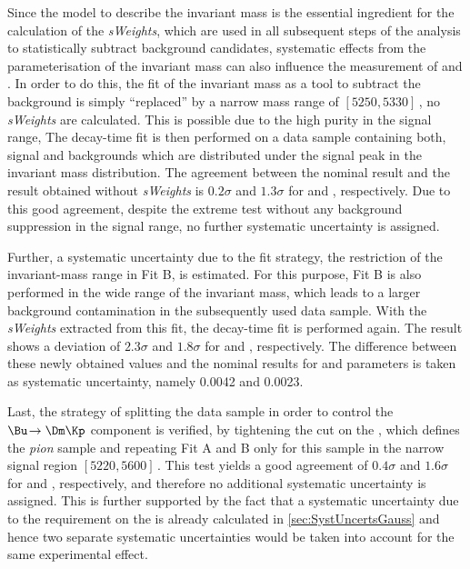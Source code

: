Since the model to describe the invariant mass is the essential ingredient for the calculation of the \emph{sWeights}, which are used in all subsequent steps of the analysis to statistically subtract background candidates, systematic effects from the parameterisation of the invariant mass can also influence the measurement of \Sf and \Sfbar.
In order to do this, the fit of the invariant mass as a tool to subtract the background is simply \enquote{replaced} by a narrow mass range of $[5250,5330]\,$\si[per-mode=symbol]{\MeVcc}, \ie no \emph{sWeights} are calculated.
This is possible due to the high purity in the signal range,
The decay-time fit is then performed on a data sample containing both, signal and backgrounds which are distributed under the signal peak in the invariant mass distribution.
The agreement between the nominal result and the result obtained without \emph{sWeights} is $0.2\sigma$ and $1.3\sigma$ for \Sf and \Sfbar, respectively.
Due to this good agreement, despite the extreme test without any background suppression in the signal range, no further systematic uncertainty is assigned.

Further, a systematic uncertainty due to the fit strategy, \ie the restriction of the invariant-mass range in Fit B, is estimated.
For this purpose, Fit B is also performed in the wide range of the invariant mass, which leads to a larger background contamination in the subsequently used data sample.
With the \emph{sWeights} extracted from this fit, the decay-time fit is performed again.
The result shows a deviation of $2.3\sigma$ and $1.8\sigma$ for \Sf and \Sfbar, respectively.
The difference between these newly obtained values and the nominal results for \Sf and \Sfbar parameters is taken as systematic uncertainty, namely \num{0.0042} and \num{0.0023}.

Last, the strategy of splitting the data sample in order to control the $\Bu\!\to\Dm\Kp$ component is verified, by tightening the cut on the \dllkpi, which defines the \emph{pion} sample and repeating Fit A and B only for this sample in the narrow signal region $[5220, 5600]\,$\si[per-mode=symbol]{\MeVcc}.
This test yields a good agreement of $0.4\sigma$ and $1.6\sigma$ for \Sf and \Sfbar, respectively, and therefore no additional systematic uncertainty is assigned.
This is further supported by the fact that a systematic uncertainty due to the requirement on the \dllkpi is already calculated in \cref{sec:SystUncertsGauss} and hence two separate systematic uncertainties would be taken into account for the same experimental effect.


